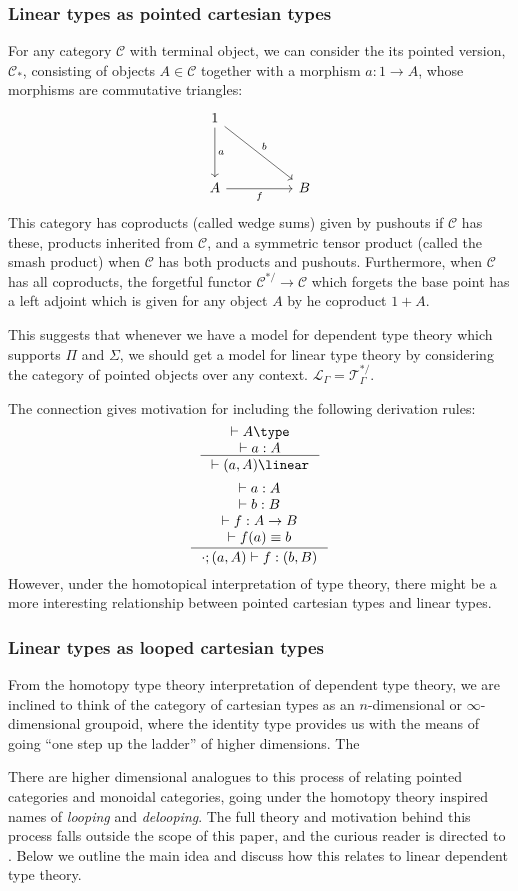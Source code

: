  \subsubsection{Linear types as pointed cartesian types}
  For any category $\mathcal{C}$ with terminal object, we can consider the its pointed version, $\mathcal{C}_*$, consisting of objects $A \in \mathcal{C}$ together with a morphism $a : 1 \to A$, whose morphisms are commutative triangles:
\[
  \ti
  1 \ar[d, "a"] \ar[dr, "b"] \\
  A \ar[r, "f",swap]& B
  \kz
\]
This category has coproducts (called wedge sums) given by pushouts if $\mathcal{C}$ has these, products inherited from $\mathcal{C}$, and a symmetric tensor product (called the smash product) when $\mathcal{C}$ has both products and pushouts. Furthermore, when $\mathcal{C}$ has all coproducts, the forgetful functor $\mathcal{C}^{*/} \to \mathcal{C}$ which forgets the base point has a left adjoint which is given for any object $A$ by he coproduct $1 + A$.

This suggests that whenever we have a model for dependent type theory which supports $\Pi$ and $\Sigma$, we should get a model for linear type theory by considering the category of pointed objects over any context. $\mathcal{L}_\Gamma = \mathcal{T}_\Gamma^{*/}$.

The connection gives motivation for including the following derivation rules:
  \[
  \inference{
    \vdash A \type\\
     \vdash a : A}
  {\vdash (a, A) \linear}
\]
\[
  \inference{
     \vdash a : A\\
     \vdash b : B\\
    \vdash f : A \to B\\
    \vdash f(a) \equiv b}
  {\cdot ; (a, A) \vdash f : (b, B)}
\]
However, under the homotopical interpretation of type theory, there might be a more interesting relationship between pointed cartesian types and linear types.
\subsubsection{Linear types as looped cartesian types}
From the homotopy type theory interpretation of dependent type theory, we are inclined to think of the category of cartesian types as an $n$-dimensional or $\infty$-dimensional groupoid, where the identity type provides us with the means of going ``one step up the ladder'' of higher dimensions. The 

There are higher dimensional analogues to this process of relating pointed categories and monoidal categories, going under the homotopy theory inspired names of \textit{looping} and \textit{delooping}. The full theory and motivation behind this process falls outside the scope of this paper, and the curious reader is directed to \cite{n-cats}. Below we outline the main idea and discuss how this relates to linear dependent type theory.

